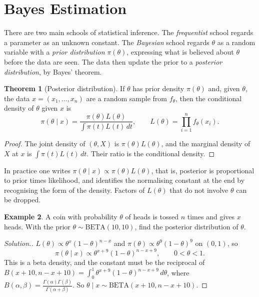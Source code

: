 \documentclass[12pt,a4paper]{report}
\theoremstyle{definition}
\newtheorem{thm}{Theorem}[section]
\newtheorem{exa}[thm]{Example}
\newenvironment{solution}
  {\renewcommand{\qedsymbol}{}\begin{proof}[\textit{Solution}.]}
  {\end{proof}}
\begin{document}
\section{Bayes Estimation}

There are two main schools of statistical inference. The \emph{frequentist} school
regards a parameter as an unknown constant. The \emph{Bayesian} school regards
$\theta$ as a random variable with a \emph{prior distribution} $\pi(\theta)$, expressing
what is believed about $\theta$ before the data are seen. The data then update the
prior to a \emph{posterior distribution}, by Bayes' theorem.

\begin{thm}[Posterior distribution]
\label{thm:posterior}
If $\theta$ has prior density $\pi(\theta)$ and, given $\theta$, the data
$x = (x_1, \dots, x_n)$ are a random sample from $f_\theta$, then the conditional
density of $\theta$ given $x$ is
\[\pi(\theta\mid x) = \frac{\pi(\theta)L(\theta)}{\int\pi(t)L(t)\,dt},\qquad
L(\theta) = \prod^n_{i = 1}f_\theta(x_i) .\]
\end{thm}

\begin{proof}
The joint density of $(\theta, X)$ is $\pi(\theta)L(\theta)$, and the marginal density of
$X$ at $x$ is $\int\pi(t)L(t)\,dt$. Their ratio is the conditional density.
\end{proof}

In practice one writes $\pi(\theta\mid x)\propto\pi(\theta)L(\theta)$, that is, posterior is
proportional to prior times likelihood, and identifies the normalising constant at
the end by recognising the form of the density. Factors of $L(\theta)$ that do not
involve $\theta$ can be dropped.

\begin{exa}
\label{ex:betabinomial}
A coin with probability $\theta$ of heads is tossed $n$ times and gives $x$ heads.
With the prior $\theta\sim\text{BETA}(10, 10)$, find the posterior distribution of
$\theta$.
\end{exa}

\begin{solution}
$L(\theta)\propto\theta^x(1 - \theta)^{n - x}$ and
$\pi(\theta)\propto\theta^9(1 - \theta)^9$ on $(0, 1)$, so
\[\pi(\theta\mid x)\propto\theta^{x + 9}(1 - \theta)^{n - x + 9},\qquad 0<\theta<1 .\]
This is a beta density, and the constant must be the reciprocal of
$B(x + 10, n - x + 10) = \int_0^1\theta^{x + 9}(1 - \theta)^{n - x + 9}\,d\theta$, where
$B(\alpha, \beta) = \frac{\Gamma(\alpha)\Gamma(\beta)}{\Gamma(\alpha + \beta)}$. So
$\theta\mid x\sim\text{BETA}(x + 10, n - x + 10)$.
\end{solution}
\end{document}
